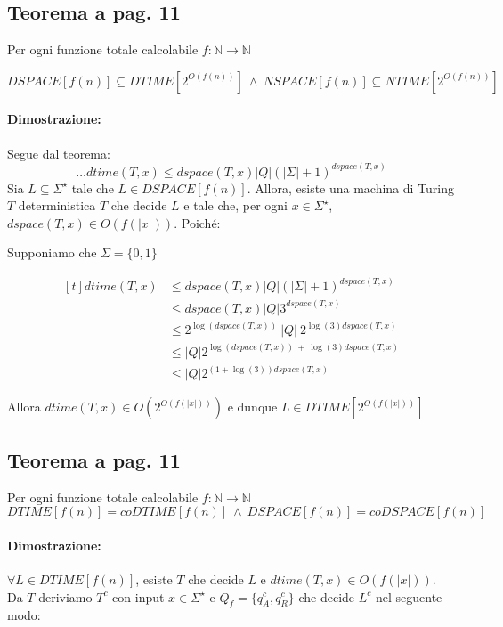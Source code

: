 \subsection{Teorema a pag. 11}

Per ogni funzione totale calcolabile $f: \mathbb{N} \rightarrow \mathbb{N}$ 

$$DSPACE[f(n)] \subseteq DTIME[2^{O(f(n))}]\ \land\ NSPACE[f(n)] \subseteq NTIME[2^{O(f(n))}]$$

\paragraph*{Dimostrazione:} Segue dal teorema:
$$\dots dtime(T, x) \leq dspace(T, x)|Q|(|\Sigma| + 1)^{dspace(T, x)}$$
Sia $L \subseteq \Sigma^{\star}$ tale che $L \in DSPACE[f(n)]$. Allora, esiste una machina di Turing $T$ deterministica $T$
che decide $L$ e tale che, per ogni $x \in \Sigma^{\star}$, $dspace(T, x) \in O(f(|x|))$. Poiché:

Supponiamo che $\Sigma = \{0, 1\}$

\[
    \begin{aligned}[t]
    dtime(T, x) &\leq dspace(T, x)|Q|(|\Sigma| + 1)^{dspace(T, x)} \\
                 &\leq dspace(T, x)|Q|3^{dspace(T, x)}\\
                 &\leq 2^{\log(dspace(T,x))}\ |Q|\ 2^{\log(3)dspace(T, x)}\\
                 &\leq |Q|2^{\log(dspace(T,x))\ +\ \log(3)dspace(T, x)}\\
                 &\leq |Q|2^{(1 + \log(3))dspace(T, x)}
    \end{aligned}
\]

Allora $dtime(T, x)\in O(2^{O(f(|x|))})$ e dunque $L\in DTIME[2^{O(f(|x|))}]$

\subsection{Teorema a pag. 11}

Per ogni funzione totale calcolabile $f: \mathbb{N} \rightarrow \mathbb{N}$ 
$$DTIME[f(n)] = coDTIME[f(n)]\ \land\ DSPACE[f(n)] = coDSPACE[f(n)]$$

\paragraph*{Dimostrazione:} $\forall L \in DTIME[f(n)]$, esiste $T$ che decide $L$ e $dtime(T, x) \in O(f(|x|))$. 
Da $T$ deriviamo $T^{c}$ con input $x \in \Sigma^{\star}$ e $Q_{f} = \{q_{A}^{c}, q_{R}^{c}\}$ che decide $L^{c}$ nel seguente modo:

